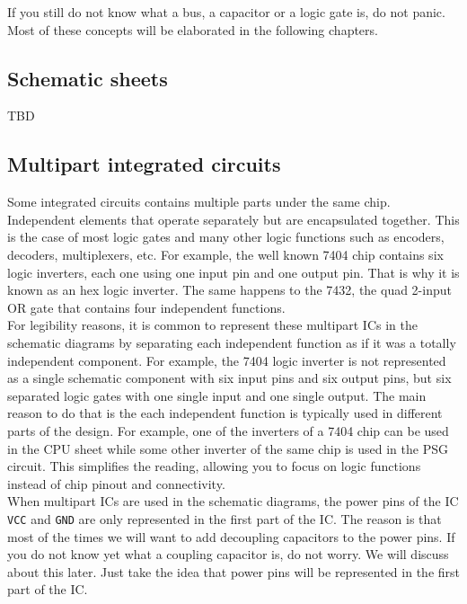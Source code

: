 If you still do not know what a bus, a capacitor or a logic gate is, do not panic. Most of these concepts will be elaborated in the following chapters.

\subsection{Schematic sheets}

TBD

\subsection{Multipart integrated circuits}

Some integrated circuits contains multiple parts under the same chip. Independent elements that operate separately but are encapsulated together. This is the case of most logic gates and many other logic functions such as encoders, decoders, multiplexers, etc. For example, the well known 7404 chip contains six logic inverters, each one using one input pin and one output pin. That is why it is known as an hex logic inverter. The same happens to the 7432, the quad 2-input OR gate that contains four independent functions. \\

For legibility reasons, it is common to represent these multipart ICs in the schematic diagrams by separating each independent function as if it was a totally independent component. For example, the 7404 logic inverter is not represented as a single schematic component with six input pins and six output pins, but six separated logic gates with one single input and one single output. The main reason to do that is the each independent function is typically used in different parts of the design. For example, one of the inverters of a 7404 chip can be used in the CPU sheet while some other inverter of the same chip is used in the PSG circuit. This simplifies the reading, allowing you to focus on logic functions instead of chip pinout and connectivity. \\

When multipart ICs are used in the schematic diagrams, the power pins of the IC {\tt VCC} and {\tt GND} are only represented in the first part of the IC. The reason is that most of the times we will want to add decoupling capacitors to the power pins. If you do not know yet what a coupling capacitor is, do not worry. We will discuss about this later. Just take the idea that power pins will be represented in the first part of the IC.\\

